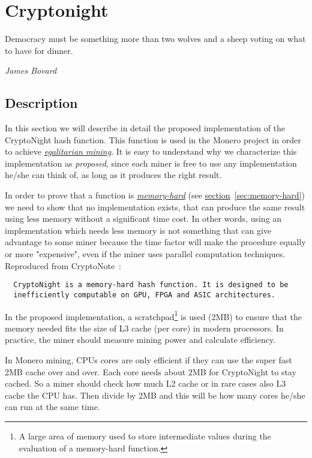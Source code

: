
\chapter{Cryptonight} \label{ch:cryptonight}
%
\epigraph{Democracy must be something more than two wolves and a sheep voting on what to have for dinner.}{\textit{James Bovard}}
%
\section{Description}
In this section we will describe in detail the proposed implementation of the CryptoNight hash function. This function is used in the Monero project in order to achieve \hyperref[sec:egalitarian]{\emph{egalitarian mining}}. It is easy to understand why we characterize this implementation as \emph{proposed}, since each miner is free to use any implementation he/she can think of, as long as it produces the right result.

In order to prove that a function is \hyperref[sec:memory-hard]{\emph{memory-hard}} (see \hyperref[sec:memory-hard]{section}~\ref{sec:memory-hard}) we need to show that no implementation exists, that can produce the same result using less memory without a significant time cost. In other words, using an implementation which needs less memory is not something that can give advantage to some miner because the time factor will make the procedure equally or more "expensive", even if the miner uses parallel computation techniques. Reproduced from CryptoNote~\cite{cryptonight}:
\begin{verbatim}
  CryptoNight is a memory-hard hash function. It is designed to be
  inefficiently computable on GPU, FPGA and ASIC architectures.
\end{verbatim}

In the proposed implementation, a scratchpad\footnote{A large area of memory used to store intermediate values during the evaluation of a memory-hard function.} is used (2MB) to ensure that the memory needed fits the size of L3 cache (per core) in modern processors. In practice, the miner should measure mining power and calculate efficiency.

In Monero mining, CPUs cores are only efficient if they can use the super fast 2MB cache over and over. Each core needs about 2MB for CryptoNight to stay cached. So a miner should check how much L2 cache or in rare cases also L3 cache the CPU has. Then divide by 2MB and this will be how many cores he/she can run at the same time.

